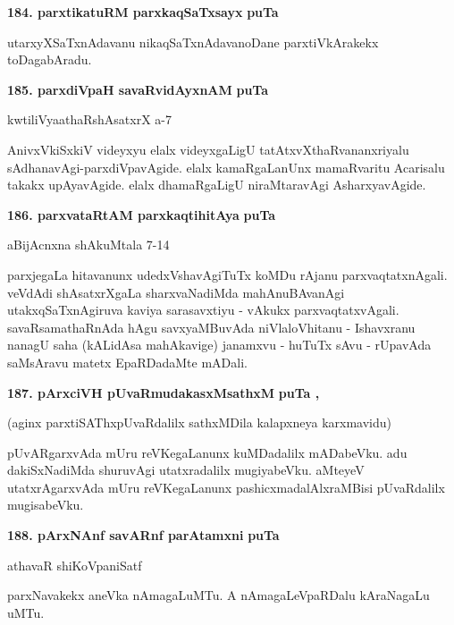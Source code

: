 \medskip
\noindent
\textbf{184. parxtikatuRM parxkaqSaTxsayx} \hfill{\bf puTa \pageref{223}}

\smallskip
utarxyXSaTxnAdavanu nikaqSaTxnAdavanoDane parxtiVkArakekx toDagabAradu.

\medskip
\noindent
\textbf{185. parxdiVpaH savaRvidAyxnAM} \hfill{\bf puTa \pageref{89}}

\hfill{kwtiliVyaathaRshAsatxrX a-7}

\smallskip
AnivxVkiSxkiV videyxyu elalx videyxgaLigU tatAtxvXthaRvananxriyalu sAdhanavAgi-\break\-parxdiVpavAgide. elalx kamaR\-gaLanUnx mamaRvaritu Acarisalu takakx upAya\-vAgide. elalx dhamaRgaLigU niraMtaravAgi Asharxya\-vAgide.

\medskip
\noindent
\textbf{186. parxvataRtAM parxkaqtihitAya} \hfill{\bf puTa \pageref{243}}

\hfill{aBijAcnxna shAkuMtala 7-14}

\smallskip
parxjegaLa hitavanunx udedxVshavAgiTuTx koMDu rAjanu parxvaqtatxnAgali. veVdAdi shAsatxrXgaLa sharxvaNadiMda mahAnuBAvanAgi utakxqSaTxnAgiruva kaviya sarasavxtiyu - vAkukx parxvaqtatxvAgali. savaRsamathaRnAda hAgu savxyaMBuvAda niVlaloVhitanu - Ishavxranu nanagU saha (kALidAsa mahAkavige) janamxvu - huTuTx sAvu - rUpavAda saMsAravu matetx EpaRDadaMte mADali.

\medskip
\noindent
\textbf{187. pArxciVH pUvaRmudakasxMsathxM} \hfill{\bf puTa \pageref{115}, \pageref{210}}

\smallskip
(aginx parxtiSAThxpUvaRdalilx sathxMDila kalapxneya karxmavidu)

pUvARgarxvAda mUru reVKegaLanunx kuMDadalilx mADabeVku. adu dakiSxNadiMda shuruvAgi utatxra\-dalilx mugiyabeVku. aMteyeV utatxrAgarxvAda mUru reVKegaLanunx pashicxmadalAlxraMBisi pUvaRdalilx mugisa\-beVku.

\medskip
\noindent
\textbf{188. pArxNAnf savARnf parAtamxni} \hfill{\bf puTa \pageref{149}}

\hfill{athavaR shiKoVpaniSatf}

\smallskip
parxNavakekx aneVka nAmagaLuMTu. A nAmagaLeVpaRDalu kAraNagaLu uMTu.

